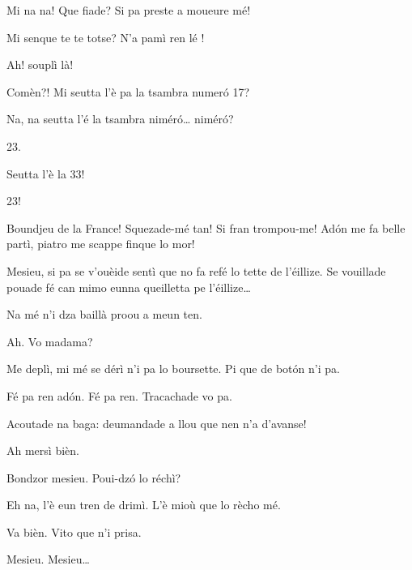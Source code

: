 \begin{drama}
\Casimirspeaks {} Mi na na! Que fiade? Si pa preste a moueure mé!

\Gerominespeaks Mi senque te te totse? N'a pamì ren lé \riye !

\Casimirspeaks Ah! souplì là!

\Priespeaks {} Comèn?! Mi seutta l’è pa la tsambra numer\'o 17?

\Casimirspeaks Na, na seutta l’é la tsambra nimér\'o\ldots {} nimér\'o?

\Gerominespeaks {} 23.

\Casimirspeaks Seutta l’è la 33!

\Gerominespeaks {} 23!

\Priespeaks Boundjeu de la France! Squezade-mé tan! Si fran trompou-me! Ad\'on me fa belle partì, piatro me scappe finque lo mor!


\Priespeaks Mesieu, si pa se v'ouèide sentì que no fa refé lo tette de l’éillize. Se vouillade pouade fé can mimo eunna queilletta pe l’éillize\ldots

\Casimirspeaks Na mé n'i dza baillà proou a meun ten.

\Priespeaks{} Ah.  Vo madama?

\Gerominespeaks Me deplì, mi mé se dérì n'i pa lo boursette. Pi que de bot\'on n'i pa.

\Priespeaks Fé pa ren ad\'on. Fé pa ren. Tracachade vo pa.

\Casimirspeaks Acoutade na baga:  deumandade a llou que nen n'a d’avanse!

\Priespeaks Ah mersì bièn.


\Priespeaks{} Bondzor mesieu. Poui-dz\'o lo réchì?

\Eunfeurmispeaks Eh na, l'è eun tren de drimì. L'è mioù que lo rècho mé.

\Priespeaks Va bièn. Vito que n'i prisa.


\Eunfeurmispeaks{} Mesieu. Mesieu\ldots



\end{drama}
